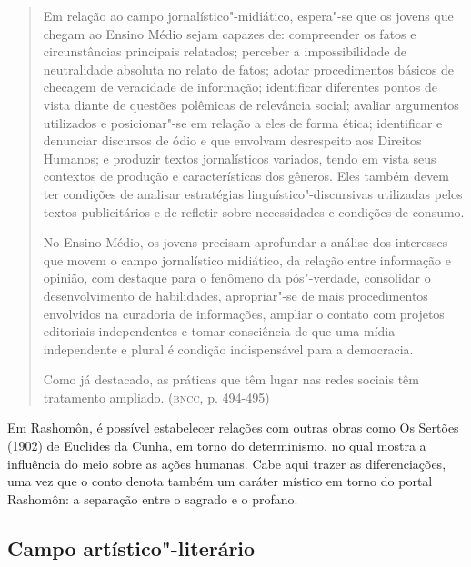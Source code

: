 \documentclass[12pt]{extarticle}
\begin{document}
\begin{quote}
Em relação ao campo jornalístico"-midiático, espera"-se que os jovens
que chegam ao Ensino Médio sejam capazes de: compreender os fatos e
circunstâncias principais relatados; perceber a impossibilidade de
neutralidade absoluta no relato de fatos; adotar procedimentos básicos
de checagem de veracidade de informação; identificar diferentes pontos
de vista diante de questões polêmicas de relevância social; avaliar
argumentos utilizados e posicionar"-se em relação a eles de forma ética;
identificar e denunciar discursos de ódio e que envolvam desrespeito aos
Direitos Humanos; e produzir textos jornalísticos variados, tendo em
vista seus contextos de produção e características dos gêneros. Eles
também devem ter condições de analisar estratégias
linguístico"-discursivas utilizadas pelos textos publicitários e de
refletir sobre necessidades e condições de consumo.

No Ensino Médio, os jovens precisam aprofundar a análise dos interesses
que movem o campo jornalístico midiático, da relação entre informação e
opinião, com destaque para o fenômeno da pós"-verdade, consolidar o
desenvolvimento de habilidades, apropriar"-se de mais procedimentos
envolvidos na curadoria de informações, ampliar o contato com projetos
editoriais independentes e tomar consciência de que uma mídia
independente e plural é condição indispensável para a democracia.

Como já destacado, as práticas que têm lugar nas redes sociais têm
tratamento ampliado. (\textsc{bncc}, p. 494-495)
\end{quote}

Em Rashomôn, é possível estabelecer relações com outras obras como Os
Sertões (1902) de Euclides da Cunha, em torno do determinismo, no qual
mostra a influência do meio sobre as ações humanas. Cabe aqui trazer
as diferenciações, uma vez que o conto denota também um caráter
místico em torno do portal Rashomôn: a separação entre o sagrado e o
profano.

\subsection{Campo artístico"-literário}
\end{document}
